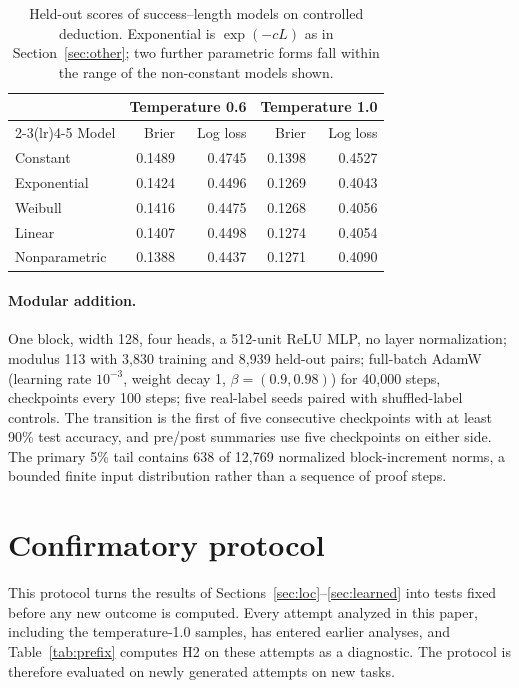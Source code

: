 \begin{table}[h]
\caption{Held-out scores of success--length models on controlled deduction. Exponential is $\exp(-cL)$ as in Section~\ref{sec:other}; two further parametric forms fall within the range of the non-constant models shown.}
\label{tab:lengthmodels}
\begin{center}
\small
\begin{tabular}{lrrrr}
\toprule
& \multicolumn{2}{c}{Temperature 0.6} & \multicolumn{2}{c}{Temperature 1.0}\\
\cmidrule(lr){2-3}\cmidrule(lr){4-5}
Model & Brier & Log loss & Brier & Log loss\\
\midrule
Constant & 0.1489 & 0.4745 & 0.1398 & 0.4527\\
Exponential & 0.1424 & 0.4496 & 0.1269 & 0.4043\\
Weibull & 0.1416 & 0.4475 & 0.1268 & 0.4056\\
Linear & 0.1407 & 0.4498 & 0.1274 & 0.4054\\
Nonparametric & 0.1388 & 0.4437 & 0.1271 & 0.4090\\
\bottomrule
\end{tabular}
\end{center}
\end{table}

\paragraph{Modular addition.} One block, width 128, four heads, a 512-unit ReLU MLP, no layer normalization; modulus 113 with 3,830 training and 8,939 held-out pairs; full-batch AdamW (learning rate $10^{-3}$, weight decay 1, $\beta=(0.9,0.98)$) for 40,000 steps, checkpoints every 100 steps; five real-label seeds paired with shuffled-label controls. The transition is the first of five consecutive checkpoints with at least 90\% test accuracy, and pre/post summaries use five checkpoints on either side. The primary 5\% tail contains 638 of 12,769 normalized block-increment norms, a bounded finite input distribution rather than a sequence of proof steps.

\section{Confirmatory protocol}\label{app:protocol}

This protocol turns the results of Sections~\ref{sec:loc}--\ref{sec:learned} into tests fixed before any new outcome is computed. Every attempt analyzed in this paper, including the temperature-1.0 samples, has entered earlier analyses, and Table~\ref{tab:prefix} computes H2 on these attempts as a diagnostic. The protocol is therefore evaluated on newly generated attempts on new tasks.

